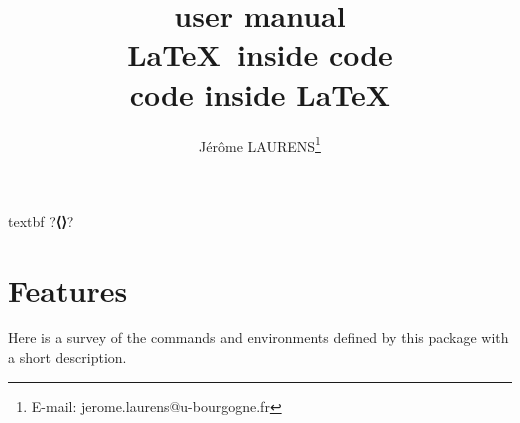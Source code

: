 \documentclass{article}
\begin{document}
\begin{CDRBlockSave}{textbf}
?\textbf{⟨⟩}?
\end{CDRBlockSave}
\title{ user manual\\
\LaTeX\ inside code\\
code inside \LaTeX
}
\author{Jérôme LAURENS\thanks{E-mail: jerome.laurens@u-bourgogne.fr}}
\maketitle
\tableofcontents


\section{Features}
Here is a survey of the commands and environments defined by this package with a short description.
\end{document}
